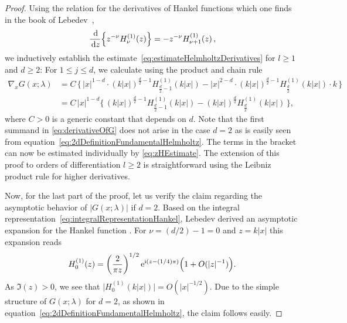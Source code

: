 \begin{proof}
  Using the relation for the derivatives of Hankel functions which one finds in the book of Lebedev~\cite[Eq.\@~(5.6.3)]{lebedev},
  \begin{align*}
    \frac{\, {\operatorname{d}\!{}}}{\, {\operatorname{d}\!{z}}} \Big\{ z^{-\nu} H_\nu^{(1)}(z) \Big\} = -z^{-\nu} H_{\nu + 1}^{(1)} (z)\,,
  \end{align*}
  we inductively establish the estimate~\eqref{eq:estimateHelmholtzDerivatives} for $l \geq 1$ and $d \geq 2$:
  For $1 \leq j \leq d$, we calculate using the product and chain rule 
  \begin{align}
    \label{eq:derivativeOfG}
    \nabla_x^{} G(x; \lambda)
    &= C  \, \Big\{\, |x|^{1 - d} \cdot (k|x|)^{\frac{d}{2} - 1} H_{\frac{d}{2} - 1}^{(1)}(k|x|) 
       - |x|^{2 - d} \cdot (k|x|)^{\frac{d}{2} - 1} H_{\frac{d}{2}}^{(1)}(k|x|) \cdot k \, \Big\} \nonumber\\[0.5em]
    &= C \, |x|^{1 - d}\Big\{\,(k|x|)^{\frac{d}{2} - 1} H_{\frac{d}{2} - 1}^{(1)}(k|x|) -  (k|x|)^{\frac{d}{2}} H_{\frac{d}{2}}^{(1)}(k|x|) \, \Big\},
  \end{align}
  where $C > 0$ is a generic constant that depends on $d$. 
  Note that the first summand in \eqref{eq:derivativeOfG} does not arise in the case $d = 2$ as is easily seen from equation~\eqref{eq:2dDefinitionFundamentalHelmholtz}.
  The terms in the bracket can now be estimated individually by \eqref{eq:zHEstimate}.
  The extension of this proof to orders of differentiation $l \geq 2$ is straightforward using the Leibniz product rule for higher derivatives.

  Now, for the last part of the proof, let us verify the claim regarding the asymptotic behavior of $|G(x; \lambda)|$ if $d = 2$.
  Based on the integral representation~\eqref{eq:integralRepresentationHankel}, Lebedev derived an asymptotic expansion for the Hankel function \cite[Sec.\@~5.11, Eq.\@~(5.11.3)]{lebedev}. 
  For $\nu = (d/2) - 1 = 0$ and $z = k|x|$ this expansion reads
  \begin{align*}
    H_0^{(1)}(z) = \left(\frac{2}{\pi z}\right)^{1/2} \mathrm{e}^{\mathrm{i} (z - (1/4) \pi)} \Big( 1 + O(|z|^{-1})\Big).
  \end{align*}
  As $\Im(z) > 0$, we see that $\big|H_0^{(1)}(k |x|)\big| = O(|x|^{-1/2})$.
  Due to the simple structure of $G(x; \lambda)$ for $d = 2$, as shown in equation~\eqref{eq:2dDefinitionFundamentalHelmholtz}, the claim follows easily.
\end{proof}

